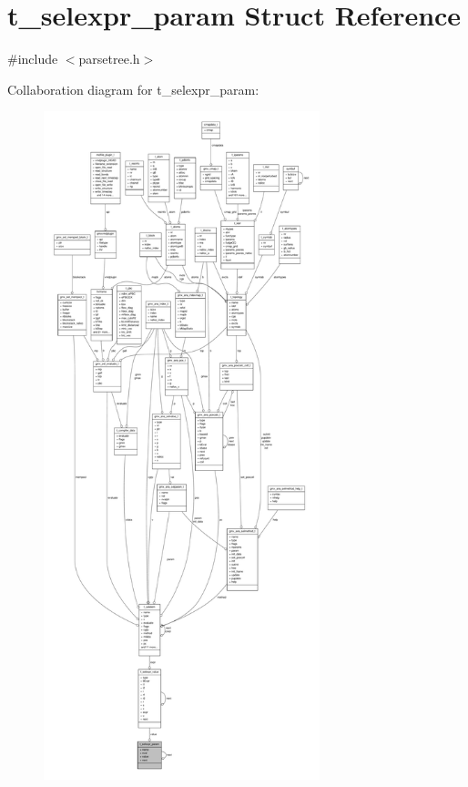 \hypertarget{structt__selexpr__param}{\section{t\-\_\-selexpr\-\_\-param \-Struct \-Reference}
\label{structt__selexpr__param}
}


{\ttfamily \#include $<$parsetree.\-h$>$}



\-Collaboration diagram for t\-\_\-selexpr\-\_\-param\-:
\nopagebreak
\begin{figure}[H]
\begin{center}
\leavevmode
\includegraphics[height=550pt]{structt__selexpr__param__coll__graph}
\end{center}
\end{figure}
